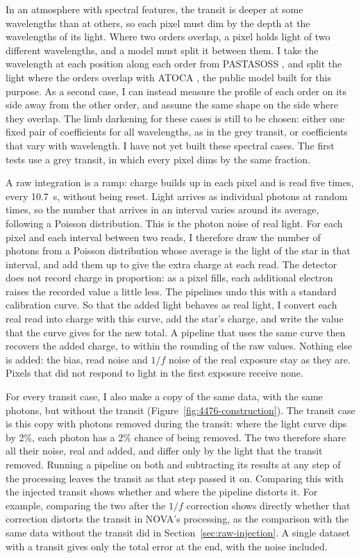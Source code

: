 In an atmosphere with spectral features, the transit is deeper at some
wavelengths than at others, so each pixel must dim by the depth at the
wavelengths of its light. Where two orders overlap, a pixel holds light of two
different wavelengths, and a model must split it between them. I take the
wavelength at each position along each order from PASTASOSS
\citep{BainesEtAl2023Wavelength}, and split the light where the orders overlap
with ATOCA \citep{DarveauBernierEtAl2022}, the public model built for this
purpose. As a second case, I can instead measure the profile of each order on
its side away from the other order, and assume the same shape on the side
where they overlap. The limb darkening for these cases is still to be chosen:
either one fixed pair of coefficients for all wavelengths, as in the grey
transit, or coefficients that vary with wavelength. I have not yet built these
spectral cases. The first tests use a grey transit, in which every pixel dims
by the same fraction.

A raw integration is a ramp: charge builds up in each pixel and is read five
times, every 10.7~s, without being reset. Light arrives as individual photons
at random times, so the number that arrives in an interval varies around its
average, following a Poisson distribution. This is the photon noise of real
light. For each pixel and each interval between two reads, I therefore draw
the number of photons from a Poisson distribution whose average is the light
of the star in that interval, and add them up to give the extra charge at each
read. The detector does not record charge in proportion: as a pixel fills,
each additional electron raises the recorded value a little less. The
pipelines undo this with a standard calibration curve. So that the added light
behaves as real light, I convert each real read into charge with this curve,
add the star's charge, and write the value that the curve gives for the new
total. A pipeline that uses the same curve then recovers the added charge, to
within the rounding of the raw values. Nothing else is added: the bias, read
noise and $1/f$ noise of the real exposure stay as they are. Pixels that did
not respond to light in the first exposure receive none.

For every transit case, I also make a copy of the same data, with the same
photons, but without the transit (Figure~\ref{fig:4476-construction}). The
transit case is this copy with photons removed during the transit: where the
light curve dips by 2\%, each photon has a 2\% chance of being removed. The
two therefore share all their noise, real and added, and differ only by the
light that the transit removed. Running a pipeline on both and subtracting its
results at any step of the processing leaves the transit as that step passed
it on. Comparing this with the injected transit shows whether and where the
pipeline distorts it. For example, comparing the two after the $1/f$
correction shows directly whether that correction distorts the transit in
NOVA's processing, as the comparison with the same data without the transit
did in Section~\ref{sec:raw-injection}. A single dataset with a transit gives
only the total error at the end, with the noise included.

